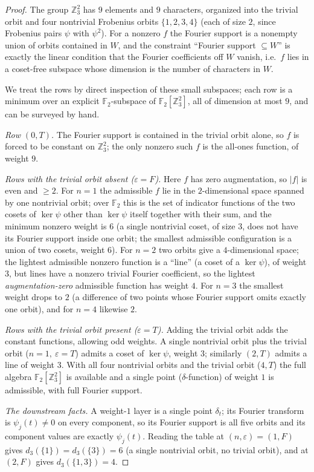\documentclass[11pt]{article}
\newcommand{\Z}{\mathbb{Z}}
\newcommand{\F}[1]{\mathbb{F}_{#1}}
\newcommand{\wt}[1]{\lvert #1\rvert}
\newcommand{\aug}{\varepsilon}
\theoremstyle{plain}
\theoremstyle{definition}
\theoremstyle{remark}
\begin{document}
\begin{proof}
The group $\Z_3^2$ has $9$ elements and $9$ characters, organized into the
trivial orbit and four nontrivial Frobenius orbits $\{1,2,3,4\}$ (each of size
$2$, since Frobenius pairs $\psi$ with $\psi^2$). For a nonzero $f$ the Fourier
support is a nonempty union of orbits contained in $W$, and the constraint
``Fourier support $\subseteq W$'' is exactly the linear condition that the Fourier
coefficients off $W$ vanish, i.e.\ $f$ lies in a coset-free subspace whose
dimension is the number of characters in $W$.

We treat the rows by direct inspection of these small subspaces; each row is a
minimum over an explicit $\F2$-subspace of $\F2[\Z_3^2]$, all of dimension at most
$9$, and can be surveyed by hand.

\emph{Row $(0,T)$.} The Fourier support is contained in the trivial orbit alone,
so $f$ is forced to be constant on $\Z_3^2$; the only nonzero such $f$ is the
all-ones function, of weight $9$.

\emph{Rows with the trivial orbit absent ($\aug=F$).} Here $f$ has zero
augmentation, so $\wt f$ is even and $\ge 2$. For $n=1$ the admissible $f$ lie in
the $2$-dimensional space spanned by one nontrivial orbit; over $\F2$ this is the
set of indicator functions of the two cosets of $\ker\psi$ other than $\ker\psi$
itself together with their sum, and the minimum nonzero weight is $6$ (a single
nontrivial coset, of size $3$, does not have its Fourier support inside one orbit;
the smallest admissible configuration is a union of two cosets, weight $6$). For
$n=2$ two orbits give a $4$-dimensional space; the lightest admissible nonzero
function is a ``line'' (a coset of a $\ker\psi$), of weight $3$, but lines have a
nonzero trivial Fourier coefficient, so the lightest \emph{augmentation-zero}
admissible function has weight $4$. For $n=3$ the smallest weight drops to $2$ (a
difference of two points whose Fourier support omits exactly one orbit), and for
$n=4$ likewise $2$.

\emph{Rows with the trivial orbit present ($\aug=T$).} Adding the trivial orbit
adds the constant functions, allowing odd weights. A single nontrivial orbit plus
the trivial orbit ($n=1,\ \aug=T$) admits a coset of $\ker\psi$, weight $3$;
similarly $(2,T)$ admits a line of weight $3$. With all four nontrivial orbits and
the trivial orbit ($4,T$) the full algebra $\F2[\Z_3^2]$ is available and a single
point ($\delta$-function) of weight $1$ is admissible, with full Fourier support.

\emph{The downstream facts.} A weight-$1$ layer is a single point $\delta_t$; its
Fourier transform is $\psi_j(t)\ne0$ on every component, so its Fourier support is
all five orbits and its component values are exactly $\psi_j(t)$. Reading the
table at $(n,\aug)=(1,F)$ gives $d_3(\{1\})=d_3(\{3\})=6$ (a single nontrivial
orbit, no trivial orbit), and at $(2,F)$ gives $d_3(\{1,3\})=4$.
\end{proof}
\end{document}
